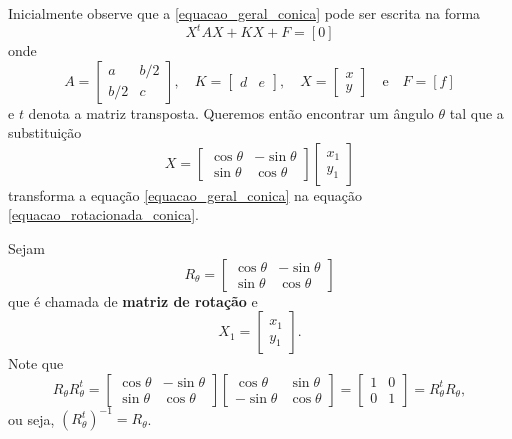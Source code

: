 Inicialmente observe que a \eqref{equacao_geral_conica} pode ser escrita na forma
\begin{equation}\label{equacao_matricial_conica}
    X^tAX + KX + F = [0]
\end{equation}
onde
\[
    A = \begin{bmatrix}
        a   & b/2 \\
        b/2 & c
    \end{bmatrix}
    , \quad K = \begin{bmatrix}
        d & e
    \end{bmatrix}, \quad X = \begin{bmatrix}
        x \\
        y
    \end{bmatrix}\quad\mbox{e}\quad F = [f]
\]
e $t$ denota a matriz transposta. Queremos então encontrar um ângulo $\theta$ tal que a substituição
\begin{equation}\label{substituicao_rotacao_eixos}
    X = \begin{bmatrix}
        \cos\theta & -\sin\theta \\
        \sin\theta & \cos\theta
    \end{bmatrix}\begin{bmatrix}
        x_1 \\y_1
    \end{bmatrix}
\end{equation}
transforma a equação \eqref{equacao_geral_conica} na equação \eqref{equacao_rotacionada_conica}.

Sejam
\[
    R_\theta = \begin{bmatrix}
        \cos\theta & -\sin\theta \\
        \sin\theta & \cos\theta
    \end{bmatrix}
\]
que é chamada de \textbf{matriz de rotação} e
\[
    X_1 = \begin{bmatrix}x_1\\y_1\end{bmatrix}.
\]
Note que
\[
    R_\theta R_\theta^t = \begin{bmatrix}
        \cos\theta & -\sin\theta \\
        \sin\theta & \cos\theta
    \end{bmatrix}\begin{bmatrix}
        \cos\theta  & \sin\theta \\
        -\sin\theta & \cos\theta
    \end{bmatrix} = \begin{bmatrix}
        1 & 0 \\
        0 & 1
    \end{bmatrix} = R_\theta^t R_\theta,
\]
ou seja, $(R_\theta^t)^{-1} = R_\theta$.

